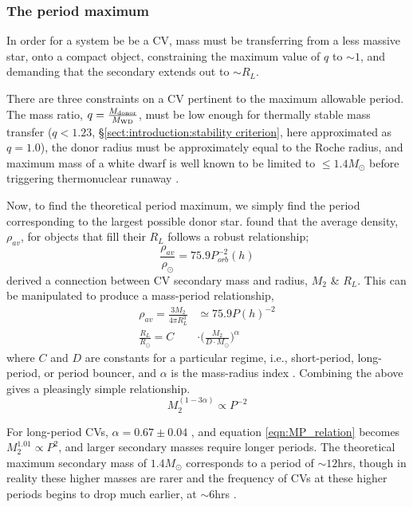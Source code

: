 \subsubsection{The period maximum}
\label{sect:introduction:period maximum}
In order for a system be be a CV, mass must be transferring from a less massive star, onto a compact object, constraining the maximum value of $q$ to $\sim1$, and demanding that the secondary extends out to $\sim R_L$. 

There are three constraints on a CV pertinent to the maximum allowable period. The mass ratio, $q = \frac{M_{\rm donor}}{M_{\rm WD}}$, must be low enough for thermally stable mass transfer ($q < 1.23$, \S\ref{sect:introduction:stability criterion}, here approximated as $q = 1.0$), the donor radius must be approximately equal to the Roche radius, and maximum mass of a white dwarf is well known to be limited to $\le 1.4M_{\odot}$ before triggering thermonuclear runaway \citep{chandrasekhar1942}.

Now, to find the theoretical period maximum, we simply find the period corresponding to the largest possible donor star. \citet{warner1995} found that the average density, $\rho_{av}$, for objects that fill their $R_L$ follows a robust relationship;
\begin{equation}
    \frac{\rho_{av}}{\rho_{\odot}} = 75.9 P_{orb}^{-2}(h)
\end{equation}
\citet{knigge11} derived a connection between CV secondary mass and radius, $M_2$ \& $R_L$. This can be manipulated to produce a mass-period relationship,
\begin{align}
    \rho_{av} = \frac{3 M_2}{4 \pi R_L^3} &\simeq 75.9 P(h)^{-2} \\
    \frac{R_L}{R_\odot} = C &\cdot \Big( \frac{M_2}{D \cdot M_\odot} \Big) ^{\alpha}
\end{align}
where $C$ and $D$ are constants for a particular regime, i.e., short-period, long-period, or period bouncer, and $\alpha$ is the mass-radius index \citep{Knigge2011b}.
Combining the above gives a pleasingly simple relationship.
\begin{equation}
\label{eqn:MP_relation}
    M_2^{(1-3\alpha)} \propto P^{-2}
\end{equation}

For long-period CVs, $\alpha = 0.67\pm0.04$ \citep{knigge11}, and equation \ref{eqn:MP_relation} becomes $M_2^{1.01} \propto P^{2}$, and larger secondary masses require longer periods. The theoretical maximum secondary mass of $1.4 M_{\odot}$ corresponds to a period of $\sim12$hrs, though in reality these higher masses are rarer and the frequency of CVs at these higher periods begins to drop much earlier, at $\sim6$hrs \citep{gaensicke2009}.


